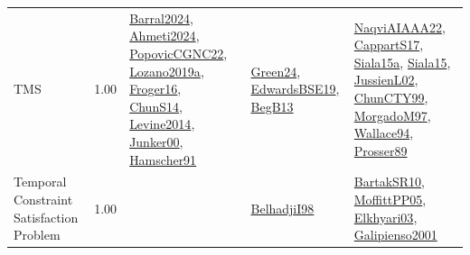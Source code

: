 {\begin{longtable}{p{3cm}r>{\raggedright\arraybackslash}p{6cm}>{\raggedright\arraybackslash}p{6cm}>{\raggedright\arraybackslash}p{8cm}}
\index{TMS}\index{Classification!TMS}TMS &  1.00 & \hyperref[detail:Barral2024]{Barral2024}, \hyperref[detail:Ahmeti2024]{Ahmeti2024}, \hyperref[detail:PopovicCGNC22]{PopovicCGNC22}, \hyperref[detail:Lozano2019a]{Lozano2019a}, \hyperref[detail:Froger16]{Froger16}, \hyperref[detail:ChunS14]{ChunS14}, \hyperref[detail:Levine2014]{Levine2014}, \hyperref[detail:Junker00]{Junker00}, \hyperref[detail:Hamscher91]{Hamscher91} & \hyperref[detail:Green24]{Green24}, \hyperref[detail:EdwardsBSE19]{EdwardsBSE19}, \hyperref[detail:BegB13]{BegB13} & \hyperref[detail:NaqviAIAAA22]{NaqviAIAAA22}, \hyperref[detail:CappartS17]{CappartS17}, \hyperref[detail:Siala15a]{Siala15a}, \hyperref[detail:Siala15]{Siala15}, \hyperref[detail:JussienL02]{JussienL02}, \hyperref[detail:ChunCTY99]{ChunCTY99}, \hyperref[detail:MorgadoM97]{MorgadoM97}, \hyperref[detail:Wallace94]{Wallace94}, \hyperref[detail:Prosser89]{Prosser89}\\
\index{Temporal Constraint Satisfaction Problem}\index{Classification!Temporal Constraint Satisfaction Problem}Temporal Constraint Satisfaction Problem &  1.00 &  & \hyperref[detail:BelhadjiI98]{BelhadjiI98} & \hyperref[detail:BartakSR10]{BartakSR10}, \hyperref[detail:MoffittPP05]{MoffittPP05}, \hyperref[detail:Elkhyari03]{Elkhyari03}, \hyperref[detail:Galipienso2001]{Galipienso2001}\\

\end{longtable}}
